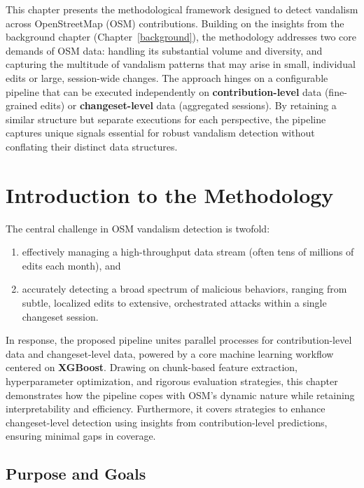 \documentclass[
    13pt, %
    a4paper, %
    DIV14, %
    listof=totoc, %
    bibliography=totoc, %
    index=totoc, %
    headsepline
]{scrreprt}
\begin{document}
\noindent
This chapter presents the methodological framework designed to detect vandalism across OpenStreetMap (OSM) contributions. Building on the insights from the background chapter (Chapter~\ref{background}), the methodology addresses two core demands of OSM data: handling its substantial volume and diversity, and capturing the multitude of vandalism patterns that may arise in small, individual edits or large, session-wide changes. The approach hinges on a configurable pipeline that can be executed independently on \textbf{contribution-level} data (fine-grained edits) or \textbf{changeset-level} data (aggregated sessions). By retaining a similar structure but separate executions for each perspective, the pipeline captures unique signals essential for robust vandalism detection without conflating their distinct data structures.

\section{Introduction to the Methodology}
\label{sec:introduction_methods}

The central challenge in OSM vandalism detection is twofold:
\begin{enumerate}[label=(\arabic*)]
    \item effectively managing a high-throughput data stream (often tens of millions of edits each month), and
    \item accurately detecting a broad spectrum of malicious behaviors, ranging from subtle, localized edits to extensive, orchestrated attacks within a single changeset session.
\end{enumerate}

In response, the proposed pipeline unites parallel processes for contribution-level data and changeset-level data, powered by a core machine learning workflow centered on \textbf{XGBoost}. Drawing on chunk-based feature extraction, hyperparameter optimization, and rigorous evaluation strategies, this chapter demonstrates how the pipeline copes with OSM’s dynamic nature while retaining interpretability and efficiency. Furthermore, it covers strategies to enhance changeset-level detection using insights from contribution-level predictions, ensuring minimal gaps in coverage.

\subsection{Purpose and Goals}
\label{sec:purpose_and_goals}
\end{document}

